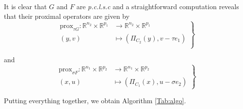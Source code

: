 \documentclass[a4paper,9pt,journal]{IEEEtran}
\begin{document}
It is clear that $G$ and $F$ are \textit{p.c.l.s.c} and a straightforward computation reveals that their proximal operators are given by
\begin{equation}
  \left .
  \begin{split}
    \text{prox}_{\tau G} : \mathbb{R}^{n_2} \times \mathbb{R}^{p_1} &\rightarrow \mathbb{R}^{n_2} \times \mathbb{R}^{p_1}\\
    (y, v) &\mapsto (\Pi_{C_2}(y), v - \tau e_1)\\
  \end{split}
  \right\}
\end{equation}

and
\begin{equation}
  \left .
  \begin{split}
    \text{prox}_{\sigma F}: \mathbb{R}^{n_1} \times \mathbb{R}^{p_2} &\rightarrow \mathbb{R}^{n_1} \times \mathbb{R}^{p_2}\\
    (x, u) &\mapsto (\Pi_{C_1}(x), u - \sigma e_2)
  \end{split}
  \right\}
\end{equation}

Putting everything together, we obtain Algorithm \ref{Tab:algo}.
\end{document}
